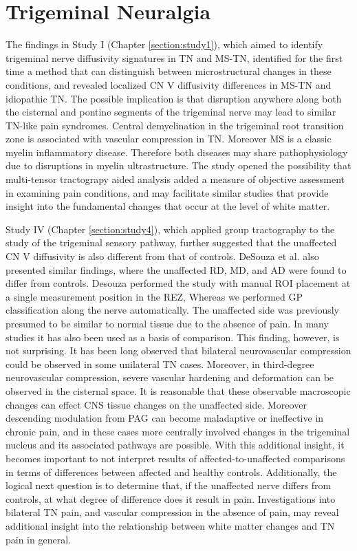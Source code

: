 \section{Trigeminal Neuralgia}

The findings in Study I (Chapter \ref{section:study1}), which aimed to identify trigeminal nerve diffusivity signatures in TN and MS-TN, identified for the first time a method that can distinguish between microstructural changes in these conditions, and revealed localized CN V diffusivity differences in MS-TN and idiopathic TN. The possible implication is that disruption anywhere along both the cisternal and pontine segments of the trigeminal nerve may lead to similar TN-like pain syndromes. Central demyelination in the trigeminal root transition zone is associated with vascular compression in TN. Moreover MS is a classic myelin inflammatory disease. Therefore both diseases may share pathophysiology due to disruptions in myelin ultrastructure. The study opened the possibility that multi-tensor tractograpy aided analysis added a measure of objective assessment in examining pain conditions, and may facilitate similar studies that provide insight into the fundamental changes that occur at the level of white matter. 

Study IV (Chapter \ref{section:study4}), which applied group tractography to the study of the trigeminal sensory pathway, further suggested that the unaffected CN V diffusivity is also different from that of controls. DeSouza et al. \cite{Desouza2013} also presented similar findings, where the unaffected RD, MD, and AD were found to differ from controls. Desouza performed the study with manual ROI placement at a single measurement position in the REZ, Whereas we performed GP classification along the nerve automatically. The unaffected side was previously presumed to be similar to normal tissue due to the absence of pain. In many studies it has also been used as a basis of comparison. This finding, however, is not surprising. It has been long observed that bilateral neurovascular compression could be observed in some unilateral TN cases. Moreover, in third-degree neurovascular compression, severe vascular hardening and deformation can be observed in the cisternal space. It is reasonable that these observable macroscopic changes can effect CNS tissue changes on the unaffected side. Moreover descending modulation from PAG can become maladaptive or ineffective in chronic pain, and in these cases more centrally involved changes in the trigeminal nucleus and its associated pathways are possible. With this additional insight, it becomes important to not interpret results of affected-to-unaffected comparisons in terms of differences between affected and healthy controls. Additionally, the logical next question is to determine that, if the unaffected nerve differs from controls, at what degree of difference does it result in pain. Investigations into bilateral TN pain, and vascular compression in the absence of pain, may reveal additional insight into the relationship between white matter changes and TN pain in general.

